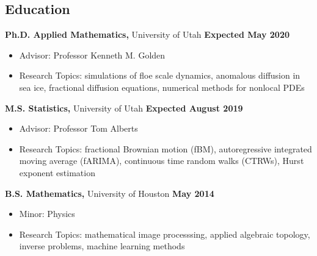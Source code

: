 \documentclass[margin,line]{res}
\begin{document}
\newcommand{\myname}{Huy Dinh}
\newlength{\mynamewidth}
\settowidth{\mynamewidth}{\namefont\myname}

\name{\hspace*{0.5\textwidth}\hspace{-0.5\mynamewidth} \myname \vspace*{.2in}}

\thispagestyle{empty}

\begin{resume}



\section{\sc Education}
{\bf Ph.D. Applied Mathematics,} University of Utah \hfill {\bf Expected May 2020}\\
\vspace*{-.1in}
\begin{itemize} \setlength\itemsep{0em}
\item[ ] Advisor: Professor Kenneth M. Golden
\item[ ] Research Topics: simulations of floe scale dynamics, anomalous diffusion in sea ice, fractional diffusion equations, numerical methods for nonlocal PDEs
\end{itemize}

{\bf M.S. Statistics,} University of Utah \hfill {\bf Expected August 2019}\\
\vspace*{-.1in}
\begin{itemize} \setlength\itemsep{0em}
\item[ ] Advisor: Professor Tom Alberts
\item[ ] Research Topics: fractional Brownian motion (fBM), autoregressive integrated moving average (fARIMA), continuous time random walks (CTRWs), Hurst exponent estimation
\end{itemize}

{\bf B.S. Mathematics,} University of Houston \hfill {\bf May 2014}\\
\vspace*{-.1in}
\begin{itemize} \setlength\itemsep{0em}
\item[ ] Minor: Physics
\item[ ] Research Topics: mathematical image processsing, applied algebraic topology, inverse problems, machine learning methods
\end{itemize}


\end{resume}
\end{document}
